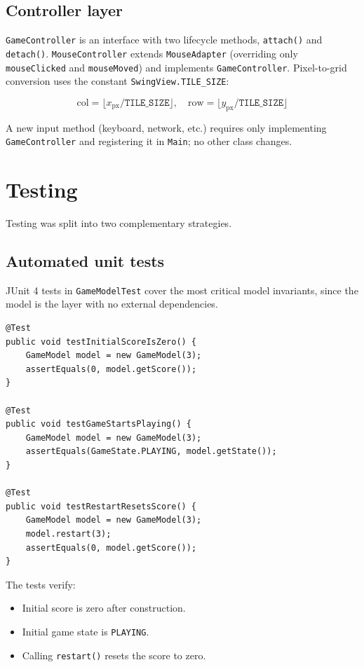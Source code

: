\documentclass[12pt,a4paper]{article}
\begin{document}
\subsection{Controller layer}

\texttt{GameController} is an interface with two lifecycle methods,
\texttt{attach()} and \texttt{detach()}.
\texttt{MouseController} extends \texttt{MouseAdapter} (overriding only
\texttt{mouseClicked} and \texttt{mouseMoved}) and implements
\texttt{GameController}.
Pixel-to-grid conversion uses the constant \texttt{SwingView.TILE\_SIZE}:

\[
  \text{col} = \lfloor x_{\text{px}} / \texttt{TILE\_SIZE} \rfloor, \quad
  \text{row} = \lfloor y_{\text{px}} / \texttt{TILE\_SIZE} \rfloor
\]

A new input method (keyboard, network, etc.) requires only implementing
\texttt{GameController} and registering it in \texttt{Main}; no other class
changes.

\section{Testing}
\label{sec:testing}

Testing was split into two complementary strategies.

\subsection{Automated unit tests}

JUnit 4 tests in \texttt{GameModelTest} cover the most critical model
invariants, since the model is the layer with no external dependencies.

\begin{lstlisting}[caption={Excerpt from \texttt{GameModelTest.java}},
                   label={lst:tests}]
@Test
public void testInitialScoreIsZero() {
    GameModel model = new GameModel(3);
    assertEquals(0, model.getScore());
}

@Test
public void testGameStartsPlaying() {
    GameModel model = new GameModel(3);
    assertEquals(GameState.PLAYING, model.getState());
}

@Test
public void testRestartResetsScore() {
    GameModel model = new GameModel(3);
    model.restart(3);
    assertEquals(0, model.getScore());
}
\end{lstlisting}

The tests verify:
\begin{itemize}
  \item Initial score is zero after construction.
  \item Initial game state is \texttt{PLAYING}.
  \item Calling \texttt{restart()} resets the score to zero.
\end{itemize}
\end{document}
